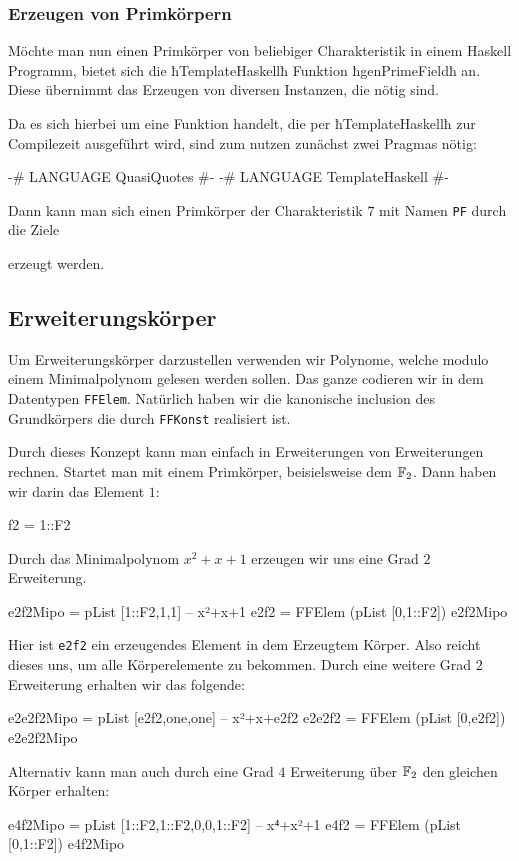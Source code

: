 \subsubsection{Erzeugen von Primkörpern}
Möchte man nun einen Primkörper von beliebiger Charakteristik in einem Haskell
Programm, bietet sich die ħTemplateHaskellħ Funktion ħgenPrimeFieldħ an. Diese
übernimmt das Erzeugen von diversen Instanzen, die nötig sind.

Da es sich hierbei um eine Funktion handelt, die per ħTemplateHaskellħ zur
Compilezeit ausgeführt wird, sind zum nutzen zunächst zwei Pragmas nötig:
\begin{hcode}
{-# LANGUAGE QuasiQuotes #-}
{-# LANGUAGE TemplateHaskell #-}
\end{hcode}
Dann kann man sich einen Primkörper der Charakteristik $7$ mit Namen
\texttt{PF} durch die Ziele
erzeugt werden.

\subsection{Erweiterungskörper}
Um Erweiterungskörper darzustellen verwenden wir Polynome, welche modulo einem
Minimalpolynom gelesen werden sollen. Das ganze codieren wir in dem Datentypen
\texttt{FFElem}.
Natürlich haben wir die kanonische inclusion des Grundkörpers die durch
\texttt{FFKonst} realisiert ist.

Durch dieses Konzept kann man einfach in Erweiterungen von Erweiterungen
rechnen.
Startet man mit einem Primkörper, beisielsweise dem $\mathbb{F}_2$. Dann haben wir
darin das Element $1$:
\begin{hcode}
f2 = 1::F2
\end{hcode}
Durch das Minimalpolynom $x^2+x+1$ erzeugen wir uns eine Grad $2$ Erweiterung.
\begin{hcode}
e2f2Mipo = pList [1::F2,1,1] -- x²+x+1
e2f2 = FFElem (pList [0,1::F2]) e2f2Mipo
\end{hcode}
Hier ist \texttt{e2f2} ein erzeugendes Element in dem Erzeugtem Körper. Also
reicht dieses uns, um alle Körperelemente zu bekommen.
Durch eine weitere Grad $2$ Erweiterung erhalten wir das folgende:
\begin{hcode}
e2e2f2Mipo = pList [e2f2,one,one] -- x²+x+e2f2
e2e2f2 = FFElem (pList [0,e2f2]) e2e2f2Mipo
\end{hcode}
Alternativ kann man auch durch eine Grad $4$ Erweiterung über $\mathbb{F}_2$ den
gleichen Körper erhalten:
\begin{hcode}
e4f2Mipo = pList [1::F2,1::F2,0,0,1::F2] -- x⁴+x²+1
e4f2 = FFElem (pList [0,1::F2]) e4f2Mipo
\end{hcode}

